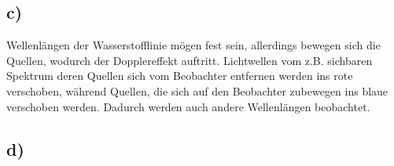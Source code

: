 \subsection{c)}

\justifying Wellenlängen der Wasserstofflinie mögen fest sein, allerdings bewegen sich
die Quellen, wodurch der Dopplereffekt auftritt. Lichtwellen vom z.B. sichbaren Spektrum deren Quellen sich vom
Beobachter entfernen werden ins rote verschoben, während Quellen, die sich auf den
Beobachter zubewegen ins blaue verschoben werden. Dadurch werden auch andere Wellenlängen  
beobachtet. 


\subsection{d)}



